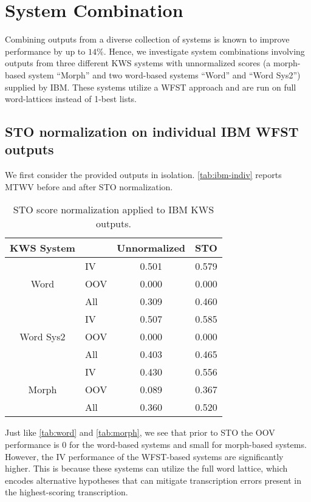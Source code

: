 \documentclass[a4paper,oneside,reqno]{amsart}
\begin{document}
\section{System Combination}

Combining outputs from a diverse collection of systems is known to improve
performance by up to $14\%$\cite{mamou2013system}. Hence, we investigate system
combinations involving outputs from three different KWS systems with
unnormalized scores (a morph-based system ``Morph'' and two word-based systems
``Word'' and ``Word Sys2'') supplied by IBM. These systems utilize a WFST
approach and are run on full word-lattices instead of 1-best lists.

\subsection{STO normalization on individual IBM WFST outputs}

We first consider the provided outputs in isolation. \autoref{tab:ibm-indiv}
reports MTWV before and after STO normalization.

\begin{table}[ht!]
  \begin{tabular}{clcc}
    \toprule
    KWS System                 &     & Unnormalized & STO \\
    \midrule
    \multirow{3}{*}{Word}      & IV  & 0.501 & 0.579\\
                               & OOV & 0.000 & 0.000\\
                               & All & 0.309 & 0.460\\
                               \hline
    \multirow{3}{*}{Word Sys2} & IV  & 0.507 & 0.585\\
                               & OOV & 0.000 & 0.000\\
                               & All & 0.403 & 0.465\\
                               \hline
    \multirow{3}{*}{Morph}     & IV  & 0.430 & 0.556\\
                               & OOV & 0.089 & 0.367\\
                               & All & 0.360 & 0.520\\
    \bottomrule
  \end{tabular}
  \caption{STO score normalization applied to IBM KWS outputs.}
  \label{tab:ibm-indiv}
\end{table}

Just like \autoref{tab:word} and \autoref{tab:morph}, we see that prior to STO
the OOV performance is $0$ for the word-based systems and small for morph-based
systems.  However, the IV performance of the WFST-based systems are
significantly higher.  This is because these systems can utilize the full word
lattice, which encodes alternative hypotheses that can mitigate transcription
errors present in the highest-scoring transcription.
\end{document}
